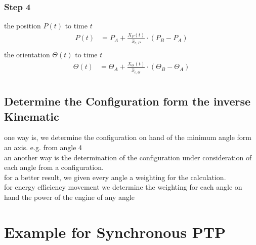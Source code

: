 \documentclass[%
  professionalfonts,%
  xcolor={%
    usenames,%
    dvipsnames,%
    svgnames,%
    table,%
    hyperref%
  }%
]{beamer}
\begin{document}
\subsubsection{Step 4}
\begin{frame}
the position $P(t)$ to time $t$
\begin{align*}
P(t) & = P_{A} + \frac{X_{P}(t)}{\hat{x}_{e,P}} \cdot \left(P_{B} - P_{A} \right)\\
\end{align*}
the orientation $\Theta(t)$ to time $t$
\begin{align*}
\Theta(t) & = \Theta_{A} + \frac{X_{\Theta}(t)}{\hat{x}_{e,\Theta}} \cdot \left(\Theta_{B} - \Theta_{A} \right)\\
\end{align*}
\end{frame}


\subsection{Determine the Configuration form the inverse Kinematic}
\begin{frame}
one way is, we determine the configuration on hand of the minimum angle form an axis. e.g. from angle 4 \\


an another way is the determination of the configuration under consideration of each angle from a configuration.\\
for a better result, we given every angle a weighting for the calculation.\\
for energy efficiency movement we determine the weighting for each angle on hand the power of the engine of any angle\\

\end{frame}

\section{Example for Synchronous PTP} 
\end{document}
